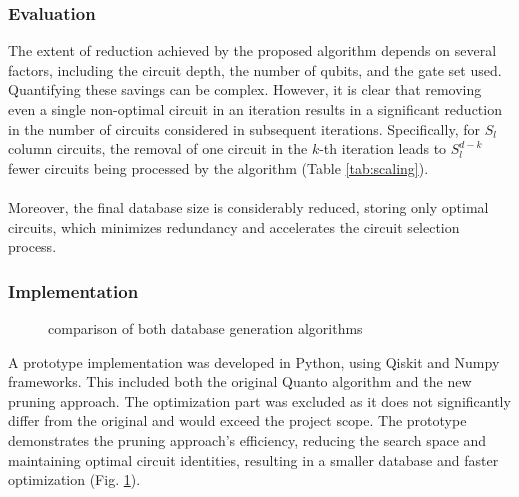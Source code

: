 \subsubsection{Evaluation}
The extent of reduction achieved by the proposed algorithm depends on several factors, including the circuit depth, the number of qubits, and the gate set used. Quantifying these savings can be complex. However, it is clear that removing even a single non-optimal circuit in an iteration results in a significant reduction in the number of circuits considered in subsequent iterations. Specifically, for $S_l$ column circuits, the removal of one circuit in the $k$-th iteration leads to $S_l^{d-k}$ fewer circuits being processed by the algorithm (Table \ref{tab:scaling}).
\\\\
Moreover, the final database size is considerably reduced, storing only optimal circuits, which minimizes redundancy and accelerates the circuit selection process.

\subsubsection{Implementation}
\begin{figure}
  \caption{comparison of both database generation algorithms}
  \label{fig:comp}
\end{figure}
A prototype implementation was developed in Python, using Qiskit and Numpy frameworks. This included both the original Quanto algorithm and the new pruning approach. The optimization part was excluded as it does not significantly differ from the original and would exceed the project scope. The prototype demonstrates the pruning approach's efficiency, reducing the search space and maintaining optimal circuit identities, resulting in a smaller database and faster optimization (Fig. \ref{fig:comp}).

